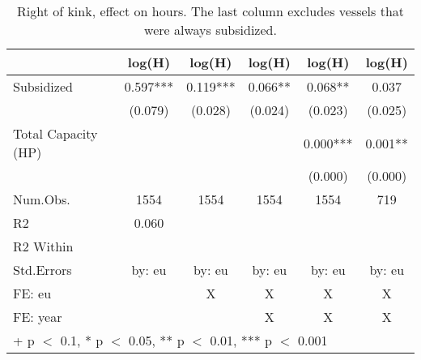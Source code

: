 \begin{table}

\caption{\label{tab:}Right of kink, effect on hours. The last column excludes vessels that were always subsidized.}
\centering
\begin{tabular}[t]{lccccc}
\toprule
  & log(H) & log(H)  & log(H)   & log(H)    & log(H)    \\
\midrule
Subsidized & \num{0.597}*** & \num{0.119}*** & \num{0.066}** & \num{0.068}** & \num{0.037}\\
 & (\num{0.079}) & (\num{0.028}) & (\num{0.024}) & (\num{0.023}) & (\num{0.025})\\
Total Capacity (HP) &  &  &  & \num{0.000}*** & \num{0.001}**\\
 &  &  &  & (\num{0.000}) & (\num{0.000})\\
\midrule
Num.Obs. & \num{1554} & \num{1554} & \num{1554} & \num{1554} & \num{719}\\
R2 & \num{0.060} &  &  &  & \\
R2 Within &  &  &  &  & \\
Std.Errors & by: eu & by: eu & by: eu & by: eu & by: eu\\
FE: eu &  & X & X & X & X\\
FE: year &  &  & X & X & X\\
\bottomrule
\multicolumn{6}{l}{\rule{0pt}{1em}+ p $<$ 0.1, * p $<$ 0.05, ** p $<$ 0.01, *** p $<$ 0.001}\\
\end{tabular}
\end{table}
